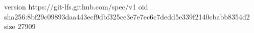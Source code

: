 version https://git-lfs.github.com/spec/v1
oid sha256:8bf29c09893daa443ecf9dbf325ce3e7e7ec6c7dedd5e339f2140cbabb8354d2
size 27909
